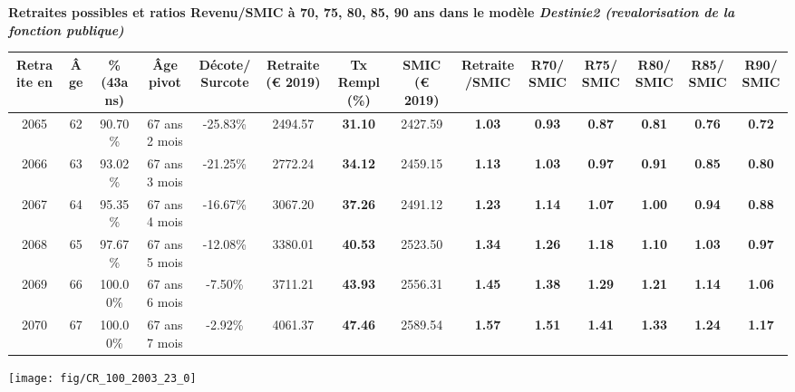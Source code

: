  \vspace{0.1cm} 
{\bf \noindent Retraites possibles et ratios Revenu/SMIC à 70, 75, 80, 85, 90 ans dans le modèle \emph{Destinie2 (revalorisation de la fonction publique)}}  
 
\begin{adjustbox}{max width=\textwidth} 
\begin{tabular}[htb]{|c|c||c|c|c||c|c||c|c||c|c|c|c|c|} 
\hline 
 Retraite en &  Âge &  \%(43ans) &  Âge pivot &  Décote/Surcote &  Retraite (\euro{} 2019) &  Tx Rempl(\%) &  SMIC (\euro{} 2019) &  Retraite/SMIC &  R70/SMIC &  R75/SMIC &  R80/SMIC &  R85/SMIC &  R90/SMIC \\ 
\hline \hline 
 2065 &  62 &  90.70\% &  67 ans 2 mois &  -25.83\% &  2494.57 &  {\bf 31.10} &  2427.59 &  {\bf 1.03} &  {\bf {\color{red} 0.93}} &  {\bf {\color{red} 0.87}} &  {\bf {\color{red} 0.81}} &  {\bf {\color{red} 0.76}} &  {\bf {\color{red} 0.72}} \\ 
\hline 
 2066 &  63 &  93.02\% &  67 ans 3 mois &  -21.25\% &  2772.24 &  {\bf 34.12} &  2459.15 &  {\bf 1.13} &  {\bf 1.03} &  {\bf {\color{red} 0.97}} &  {\bf {\color{red} 0.91}} &  {\bf {\color{red} 0.85}} &  {\bf {\color{red} 0.80}} \\ 
\hline 
 2067 &  64 &  95.35\% &  67 ans 4 mois &  -16.67\% &  3067.20 &  {\bf 37.26} &  2491.12 &  {\bf 1.23} &  {\bf 1.14} &  {\bf 1.07} &  {\bf 1.00} &  {\bf {\color{red} 0.94}} &  {\bf {\color{red} 0.88}} \\ 
\hline 
 2068 &  65 &  97.67\% &  67 ans 5 mois &  -12.08\% &  3380.01 &  {\bf 40.53} &  2523.50 &  {\bf 1.34} &  {\bf 1.26} &  {\bf 1.18} &  {\bf 1.10} &  {\bf 1.03} &  {\bf {\color{red} 0.97}} \\ 
\hline 
 2069 &  66 &  100.00\% &  67 ans 6 mois &  -7.50\% &  3711.21 &  {\bf 43.93} &  2556.31 &  {\bf 1.45} &  {\bf 1.38} &  {\bf 1.29} &  {\bf 1.21} &  {\bf 1.14} &  {\bf 1.06} \\ 
\hline 
 2070 &  67 &  100.00\% &  67 ans 7 mois &  -2.92\% &  4061.37 &  {\bf 47.46} &  2589.54 &  {\bf 1.57} &  {\bf 1.51} &  {\bf 1.41} &  {\bf 1.33} &  {\bf 1.24} &  {\bf 1.17} \\ 
\hline 
\hline 
\end{tabular} 
\end{adjustbox} 
 
 \vspace{0.1cm} 

 {\hspace{-2.2cm}\texttt{[image: fig/CR\_100\_2003\_23\_0]}} 


